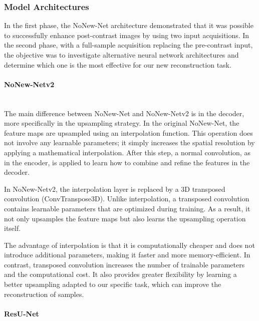 \documentclass[12pt]{article}
\begin{document}
\subsubsection{Model Architectures}

In the first phase, the NoNew-Net architecture demonstrated that it was possible to successfully enhance post-contrast images by using two input acquisitions.
In the second phase, with a full-sample acquisition replacing the pre-contrast input, the objective was to investigate alternative neural network architectures and determine which one is the most effective for our new reconstruction task.

\paragraph{NoNew-Netv2}
\mbox{}\\

The main difference between NoNew-Net and NoNew-Netv2 is in the decoder, more specifically in the upsampling strategy.
In the original NoNew-Net, the feature maps are upsampled using an interpolation function.
This operation does not involve any learnable parameters; it simply increases the spatial resolution by applying a mathematical interpolation.
After this step, a normal convolution, as in the encoder, is applied to learn how to combine and refine the features in the decoder.
\vspace{0.5cm}

In NoNew-Netv2, the interpolation layer is replaced by a 3D transposed convolution (ConvTranspose3D).
Unlike interpolation, a transposed convolution contains learnable parameters that are optimized during training.
As a result, it not only upsamples the feature maps but also learns the upsampling operation itself.
\vspace{0.5cm}

The advantage of interpolation is that it is computationally cheaper and does not introduce additional parameters, making it faster and more memory-efficient.
In contrast, transposed convolution increases the number of trainable parameters and the computational cost.
It also provides greater flexibility by learning a better upsampling adapted to our specific task, which can improve the reconstruction of samples.

\paragraph{ResU-Net}
\mbox{}\\
\end{document}
